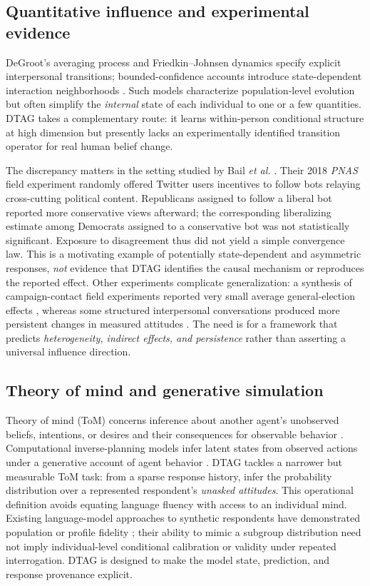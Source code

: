 \documentclass[journal,10pt]{IEEEtran}
\begin{document}
\subsection{Quantitative influence and experimental evidence}
DeGroot's averaging process \cite{degroot1974} and Friedkin--Johnsen dynamics \cite{friedkin1990} specify explicit interpersonal transitions; bounded-confidence accounts introduce state-dependent interaction neighborhoods \cite{hegselmann2002}. Such models characterize population-level evolution but often simplify the \emph{internal} state of each individual to one or a few quantities. DTAG takes a complementary route: it learns within-person conditional structure at high dimension but presently lacks an experimentally identified transition operator for real human belief change.

The discrepancy matters in the setting studied by Bail \emph{et al.} \cite{bail2018}. Their 2018 \emph{PNAS} field experiment randomly offered Twitter users incentives to follow bots relaying cross-cutting political content. Republicans assigned to follow a liberal bot reported more conservative views afterward; the corresponding liberalizing estimate among Democrats assigned to a conservative bot was not statistically significant. Exposure to disagreement thus did not yield a simple convergence law. This is a motivating example of potentially state-dependent and asymmetric responses, \emph{not} evidence that DTAG identifies the causal mechanism or reproduces the reported effect. Other experiments complicate generalization: a synthesis of campaign-contact field experiments reported very small average general-election effects \cite{kalla2018}, whereas some structured interpersonal conversations produced more persistent changes in measured attitudes \cite{broockman2016}. The need is for a framework that predicts \emph{heterogeneity, indirect effects, and persistence} rather than asserting a universal influence direction.

\subsection{Theory of mind and generative simulation}
Theory of mind (ToM) concerns inference about another agent's unobserved beliefs, intentions, or desires and their consequences for observable behavior \cite{premack1978,dennett1987}. Computational inverse-planning models infer latent states from observed actions under a generative account of agent behavior \cite{baker2009}. DTAG tackles a narrower but measurable ToM task: from a sparse response history, infer the probability distribution over a represented respondent's \emph{unasked attitudes}. This operational definition avoids equating language fluency with access to an individual mind. Existing language-model approaches to synthetic respondents have demonstrated population or profile fidelity \cite{argyle2023,park2023}; their ability to mimic a subgroup distribution need not imply individual-level conditional calibration or validity under repeated interrogation. DTAG is designed to make the model state, prediction, and response provenance explicit.
\end{document}
